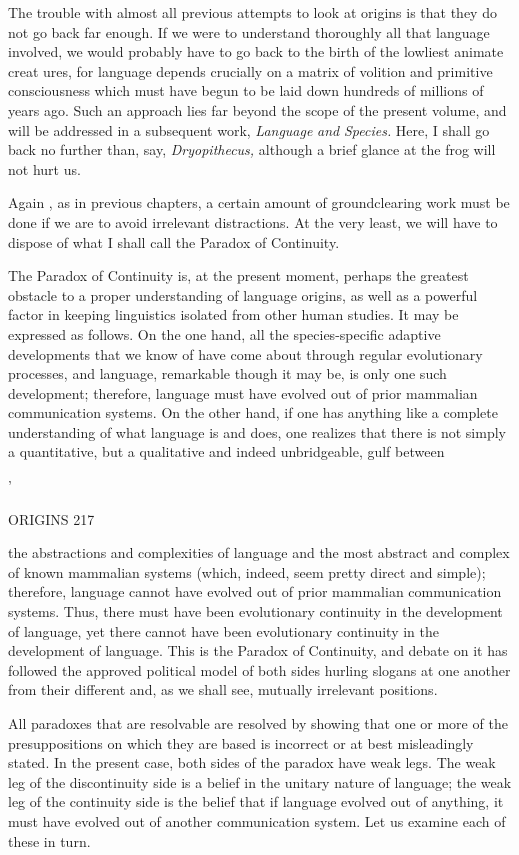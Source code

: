 The trouble with almost all previous attempts to look at origins is that they do not go back far enough. If we were to understand thoroughly all that language involved, we would probably have to go back to the birth of the lowliest animate creat ures, for language depends crucially on a matrix of volition and primitive consciousness which must have begun to be laid down hundreds of millions of years ago. Such an approach lies far beyond the scope of the present volume, and will be addressed in a subsequent work, \textit{Language} \textit{and} \textit{Species.} Here, I shall go back no further than, say, \textit{Dryopithecus,} although a brief glance at the frog will not hurt us.

Again , as in previous chapters, a certain amount of ground\-clearing work must be done if we are to avoid irrelevant distractions. At the very least, we will have to dispose of what I shall call the Para\-dox of Continuity.

The Paradox of Continuity is, at the present moment, perhaps the greatest obstacle to a proper understanding of language origins, as well as a powerful factor in keeping linguistics isolated from other human studies. It may be expressed as follows. On the one hand, all the species-specific adaptive developments that we know of have come about through regular evolutionary processes, and language, remarkable though it may be, is only one such development; therefore, language must have evolved out of prior mammalian communication systems. On the other hand, if one has anything like a complete understanding of what language is and does, one realizes that there is not simply a quantitative, but a qualitative and indeed unbridgeable, gulf between

'

ORIGINS 217

the abstractions and complexities of language and the most abstract and complex of known mammalian systems (which, indeed, seem pretty direct and simple); therefore, language cannot have evolved out of prior mammalian communication systems. Thus, there must have been evolutionary continuity in the development of language, yet there cannot have been evolutionary continuity in the development of language. This is the Paradox of Continuity, and debate on it has followed the approved political model of both sides hurling slogans at one another from their different and, as we shall see, mutually irrele\-vant positions.

All paradoxes that are resolvable are resolved by showing that one or more of the presuppositions on which they are based is incorrect or at best misleadingly stated. In the present case, both sides of the paradox have weak legs. The weak leg of the discontinuity side is a belief in the unitary nature of language; the weak leg of the continuity side is the belief that if language evolved out of anything, it must have evolved out of another communication system. Let us examine each of these in turn.

